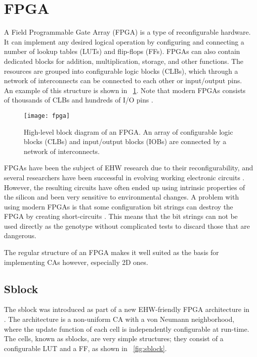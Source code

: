 \section{FPGA}

A Field Programmable Gate Array (FPGA) is a type of reconfigurable hardware.
It can implement any desired logical operation by configuring and connecting a number of lookup tables (LUTs) and flip-flops (FFs).
FPGAs can also contain dedicated blocks for addition, multiplication, storage, and other functions.
The resources are grouped into configurable logic blocks (CLBs), which through a network of interconnects can be connected to each other or input/output pins.
An example of this structure is shown in \figurename~\ref{fig:fpga}.
Note that modern FPGAs consists of thousands of CLBs and hundreds of I/O pins \cite{ds160}.

\begin{figure}[!ht]
    \centering
    \texttt{[image: fpga]}
    \caption[FPGA]{
        High-level block diagram of an FPGA.
        An array of configurable logic blocks (CLBs) and input/output blocks (IOBs) are connected by a network of interconnects.
    }
    \label{fig:fpga}
\end{figure}

FPGAs have been the subject of EHW research due to their reconfigurability, and several researchers have been successful in evolving working electronic circuits \cite{huelsbergen1998evolution, thompson1997evolved}.
However, the resulting circuits have often ended up using intrinsic properties of the silicon and been very sensitive to environmental changes.
A problem with using modern FPGAs is that some configuration bit strings can destroy the FPGA by creating short-circuits \cite{xapp151, ug380}.
This means that the bit strings can not be used directly as the genotype without complicated tests to discard those that are dangerous.

The regular structure of an FPGA makes it well suited as the basis for implementing CAs however, especially 2D ones.

\subsection{Sblock}
\label{sec:sblock}

The sblock was introduced as part of a new EHW-friendly FPGA architecture in \cite{haddow2000sblock}.
The architecture is a non-uniform CA with a von Neumann neighborhood, where the update function of each cell is independently configurable at run-time.
The cells, known as sblocks, are very simple structures; they consist of a configurable LUT and a FF, as shown in \figurename~\ref{fig:sblock}.

